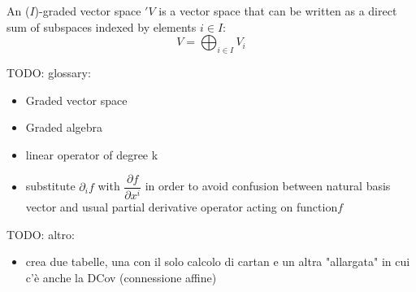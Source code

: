 \documentclass[a4paper,12pt]{scrartcl}
\begin{document}
\begin{landscape}
\begin{minipage}{0.46 \linewidth}
	\end{minipage}
	
	\begin{minipage}{0.46 \linewidth}
\newpage
		An ($I$)-graded vector space $'V$ is a vector space that can be written as a direct sum of subspaces indexed by elements $i\in I$:
		\begin{displaymath}
			V = \bigoplus_{i \in I} V_i
		\end{displaymath}
	\end{minipage}
	\hspace{1cm}
	\begin{minipage}{0.46 \linewidth}
 		TODO: glossary:
 			\begin{itemize}
 				\item Graded vector space
 				\item Graded algebra
 				\item linear operator of degree k
 				\item substitute $\partial_i f $ with $\dfrac{\partial f}{\partial x^i}$ in order to avoid confusion between natural basis vector and usual partial derivative operator acting on function$f$
 			\end{itemize}
 		TODO: altro:
 			\begin{itemize}
 				\item crea due tabelle, una con il solo calcolo di cartan e un altra "allargata" in cui c'è anche la DCov (connessione affine)
 			\end{itemize}
	\end{minipage} 
    
  \end{landscape}
\end{document}

